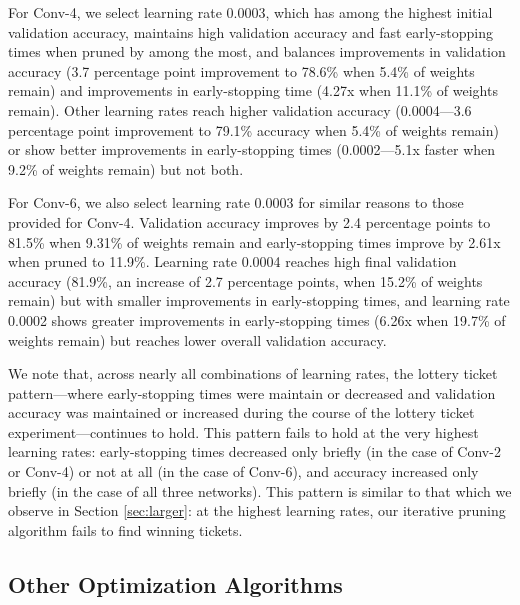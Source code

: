 For Conv-4, we select learning rate 0.0003, which has among the highest initial validation accuracy, maintains high validation accuracy and fast early-stopping
times when pruned
by among the most, and balances improvements in validation accuracy (3.7 percentage point improvement to 78.6\% when 5.4\% of weights remain)
and improvements in early-stopping time (4.27x when 11.1\% of weights remain). Other learning rates reach higher validation accuracy
(0.0004---3.6 percentage point improvement to 79.1\% accuracy when 5.4\% of weights remain) or show better improvements in early-stopping
times (0.0002---5.1x faster when
9.2\% of weights remain) but not both. 

For Conv-6, we also select learning rate 0.0003 for similar reasons to those provided for Conv-4. Validation accuracy improves by 2.4 percentage points
to 81.5\% when 9.31\%
of weights remain and early-stopping times improve by 2.61x when pruned to 11.9\%. Learning rate 0.0004 reaches high final validation accuracy (81.9\%, an increase of 2.7
percentage points, when 15.2\% of weights remain) but with smaller improvements in early-stopping times,
and learning rate 0.0002 shows greater improvements in early-stopping times (6.26x when 19.7\% of weights
remain) but reaches lower overall validation accuracy.

We note that, across nearly all combinations of learning rates, the lottery ticket pattern---where early-stopping times were maintain or decreased and validation accuracy 
was maintained or increased during the course of the lottery ticket experiment---continues to hold. This pattern fails to hold at the very highest
learning rates: early-stopping times decreased only briefly (in the case of Conv-2 or Conv-4) or not at all (in the case of Conv-6), and accuracy increased only
briefly (in the case of all three networks). This pattern is similar to that which we observe in Section \ref{sec:larger}: at the highest learning rates, our
iterative pruning algorithm fails to find winning tickets.

\subsection{Other Optimization Algorithms}

